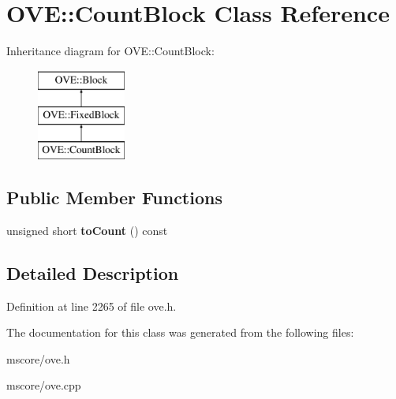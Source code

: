\hypertarget{class_o_v_e_1_1_count_block}{}\section{O\+VE\+:\+:Count\+Block Class Reference}
\label{class_o_v_e_1_1_count_block}
Inheritance diagram for O\+VE\+:\+:Count\+Block\+:\begin{figure}[H]
\begin{center}
\leavevmode
\includegraphics[height=3.000000cm]{class_o_v_e_1_1_count_block}
\end{center}
\end{figure}
\subsection*{Public Member Functions}
\begin{DoxyCompactItemize}
\item 
\mbox{\label{class_o_v_e_1_1_count_block_a222139772456299a48a622721bea9f63}} 
unsigned short {\bfseries to\+Count} () const
\end{DoxyCompactItemize}


\subsection{Detailed Description}


Definition at line 2265 of file ove.\+h.



The documentation for this class was generated from the following files\+:\begin{DoxyCompactItemize}
\item 
mscore/ove.\+h\item 
mscore/ove.\+cpp\end{DoxyCompactItemize}
